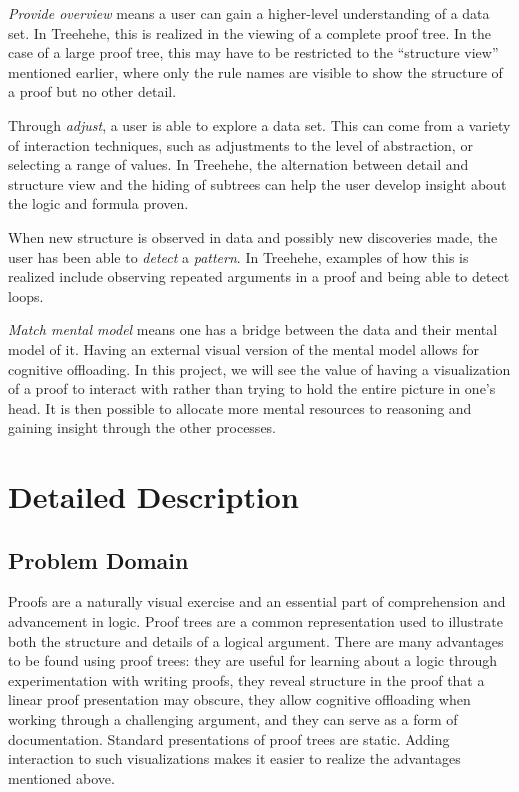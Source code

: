 \documentclass[12pt]{article}
\newcommand{\projectname}{Treehehe}
\begin{document}
\textit{Provide overview} means a user can gain a higher-level understanding of a data set. In \projectname{}, this is realized in the viewing of a complete proof tree. In the case of a large proof tree, this may have to be restricted to the ``structure view'' mentioned earlier, where only the rule names are visible to show the structure of a proof but no other detail.

Through \textit{adjust}, a user is able to explore a data set. This can come from a variety of interaction techniques, such as adjustments to the level of abstraction, or selecting a range of values. In \projectname{}, the alternation between detail and structure view and the hiding of subtrees can help the user develop insight about the logic and formula proven. 

When new structure is observed in data and possibly new discoveries made, the user has been able to \textit{detect} a \textit{pattern}. In \projectname{}, examples of how this is realized include observing repeated arguments in a proof and being able to detect loops.

\textit{Match mental model} means one has a bridge between the data and their mental model of it. Having an external visual version of the mental model allows for cognitive offloading. In this project, we will see the value of having a visualization of a proof to interact with rather than trying to hold the entire picture in one's head. It is then possible to allocate more mental resources to reasoning and gaining insight through the other processes.


\section{Detailed Description}


\subsection{Problem Domain}

Proofs are a naturally visual exercise and an essential part of comprehension and advancement in logic. Proof trees are a common representation used to illustrate both the structure and details of a logical argument. There are many advantages to be found using proof trees: they are useful for learning about a logic through experimentation with writing proofs, they reveal structure in the proof that a linear proof presentation may obscure, they allow cognitive offloading when working through a challenging argument, and they can serve as a form of documentation. Standard presentations of proof trees are static. Adding interaction to such visualizations makes it easier to realize the advantages mentioned above.
\end{document}
